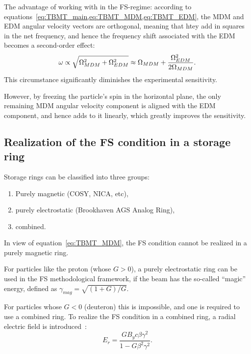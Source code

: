 The advantage of working with in the FS-regime:
according to equations~\cref{eq:TBMT_main,eq:TBMT_MDM,eq:TBMT_EDM}, the MDM and EDM
angular velocity vectors are orthogonal, meaning that htey add in squares in the net frequency,
and hence the frequency shift associated with the EDM becomes a second-order effect:~\cite[p.~5]{Mane:SpinWheel}
\[
\omega \propto \sqrt{\Omega_{MDM}^2 + \Omega_{EDM}^2} \approx \Omega_{MDM} + \frac{\Omega_{EDM}^2}{2\Omega_{MDM}}.
\]
This circumstance significantly diminishes the experimental sensitivity.

However, by freezing the particle's spin in the horizontal plane, the only remaining
MDM angular velocity component is aligned with the EDM component, and hence adds to it
linearly, which greatly improves the sensitivity.

\subsection{Realization of the FS condition in a storage ring}\label{sec:FS_in_a_ring}
Storage rings can be classified into three groups:
\begin{enumerate}
	\item Purely magnetic (COSY, NICA, etc),
	\item purely electrostatic (Brookhaven AGS Analog Ring),
	\item combined.
\end{enumerate}

In view of equation~\eqref{eq:TBMT_MDM}, the FS condition cannot be realized in a purely magnetic ring.

For particles like the proton (whose $G>0$), a purely electrostatic ring can
be used in the FS methodological framework, if the beam has the so-called ``magic''
energy, defined as $\gamma_{mag} = \sqrt{(1+G)/G}$.

For particles whose $G<0$ (deuteron) this is impossible, and one is required to use a combined ring.
To realize the FS condition in a combined ring, a radial electric field is introduced~\cite{BNL:Deuteron2008}:
\begin{equation}\label{eq:FS_Er}
E_r = \frac{GB_yc\beta\gamma^2}{1-G\beta^2\gamma^2}.
\end{equation}
